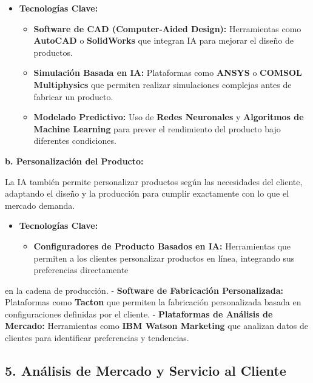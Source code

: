 \documentclass[
  10pt,
  letterpaper,
]{book}
\providecommand{\tightlist}{%
  \setlength{\itemsep}{0pt}\setlength{\parskip}{0pt}}\usepackage{longtable,booktabs,array}
\begin{document}
\begin{itemize}
\tightlist
\item
  \textbf{Tecnologías Clave:}

  \begin{itemize}
  \tightlist
  \item
    \textbf{Software de CAD (Computer-Aided Design):} Herramientas como
    \textbf{AutoCAD} o \textbf{SolidWorks} que integran IA para mejorar
    el diseño de productos.
  \item
    \textbf{Simulación Basada en IA:} Plataformas como \textbf{ANSYS} o
    \textbf{COMSOL Multiphysics} que permiten realizar simulaciones
    complejas antes de fabricar un producto.
  \item
    \textbf{Modelado Predictivo:} Uso de \textbf{Redes Neuronales} y
    \textbf{Algoritmos de Machine Learning} para prever el rendimiento
    del producto bajo diferentes condiciones.
  \end{itemize}
\end{itemize}

\textbf{b. Personalización del Producto:}

La IA también permite personalizar productos según las necesidades del
cliente, adaptando el diseño y la producción para cumplir exactamente
con lo que el mercado demanda.

\begin{itemize}
\tightlist
\item
  \textbf{Tecnologías Clave:}

  \begin{itemize}
  \tightlist
  \item
    \textbf{Configuradores de Producto Basados en IA:} Herramientas que
    permiten a los clientes personalizar productos en línea, integrando
    sus preferencias directamente
  \end{itemize}
\end{itemize}

en la cadena de producción. - \textbf{Software de Fabricación
Personalizada:} Plataformas como \textbf{Tacton} que permiten la
fabricación personalizada basada en configuraciones definidas por el
cliente. - \textbf{Plataformas de Análisis de Mercado:} Herramientas
como \textbf{IBM Watson Marketing} que analizan datos de clientes para
identificar preferencias y tendencias.

\subsection{\texorpdfstring{5. \textbf{Análisis de Mercado y Servicio al
Cliente}}{5. Análisis de Mercado y Servicio al Cliente}}\label{anuxe1lisis-de-mercado-y-servicio-al-cliente}
\end{document}
